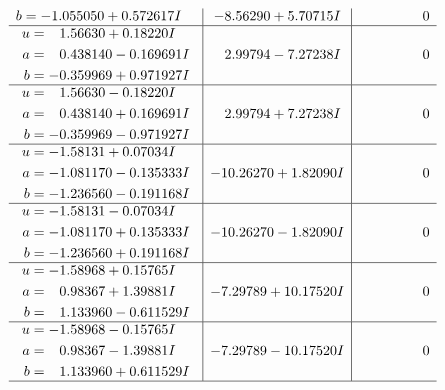 \documentclass[1p]{elsarticle_modified}
\theoremstyle{definition}
\begin{document}
$$\begin{array}{c|c|c}
\begin{aligned}
b &= -1.055050 + 0.572617 I\end{aligned}
 & -8.56290 + 5.70715 I & \phantom{-0.000000 } 0 \\ \hline\begin{aligned}
u &= \phantom{-}1.56630 + 0.18220 I \\
a &= \phantom{-}0.438140 - 0.169691 I \\
b &= -0.359969 + 0.971927 I\end{aligned}
 & \phantom{-}2.99794 - 7.27238 I & \phantom{-0.000000 } 0 \\ \hline\begin{aligned}
u &= \phantom{-}1.56630 - 0.18220 I \\
a &= \phantom{-}0.438140 + 0.169691 I \\
b &= -0.359969 - 0.971927 I\end{aligned}
 & \phantom{-}2.99794 + 7.27238 I & \phantom{-0.000000 } 0 \\ \hline\begin{aligned}
u &= -1.58131 + 0.07034 I \\
a &= -1.081170 - 0.135333 I \\
b &= -1.236560 - 0.191168 I\end{aligned}
 & -10.26270 + 1.82090 I & \phantom{-0.000000 } 0 \\ \hline\begin{aligned}
u &= -1.58131 - 0.07034 I \\
a &= -1.081170 + 0.135333 I \\
b &= -1.236560 + 0.191168 I\end{aligned}
 & -10.26270 - 1.82090 I & \phantom{-0.000000 } 0 \\ \hline\begin{aligned}
u &= -1.58968 + 0.15765 I \\
a &= \phantom{-}0.98367 + 1.39881 I \\
b &= \phantom{-}1.133960 - 0.611529 I\end{aligned}
 & -7.29789 + 10.17520 I & \phantom{-0.000000 } 0 \\ \hline\begin{aligned}
u &= -1.58968 - 0.15765 I \\
a &= \phantom{-}0.98367 - 1.39881 I \\
b &= \phantom{-}1.133960 + 0.611529 I\end{aligned}
 & -7.29789 - 10.17520 I & \phantom{-0.000000 } 0\\
 \hline 
 \end{array}$$\newpage$$\begin{array}{c|c|c}  

\end{array}$$
\end{document}
